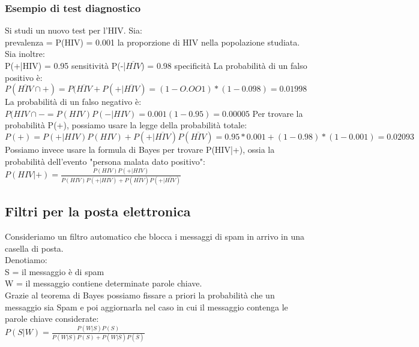 \documentclass{article}
\begin{document}
\subsubsection{Esempio di test diagnostico}
Si studi un nuovo test per l'HIV.
Sia:\\
prevalenza = P(HIV) = 0.001 la proporzione di HIV nella popolazione studiata.\\
Sia inoltre:\\
P(+|HIV) = 0.95 sensitività
P(-|$\overline{HIV}$) = 0.98 specificità
La probabilità di un falso positivo è:\\
$P(\overline{HIV}\cap{+}) = P(\overline{HIV}+P(+|\overline{HIV}) = (1-O.OO1)*(1-0.098) = 0.01998$\\
La probabilità di un falso negativo è:\\
$P({HIV}\cap{-} = P(HIV)P(-|HIV) = 0.001(1-0.95) = 0.00005$
Per trovare la probabilità P(+), possiamo usare la legge della probabilità totale:\\
$P(+) = P (+|HIV)P(HIV)+P(+|\overline{HIV})P(\overline{HIV}) = 0.95*0.001+(1-0.98)*(1-0.001) = 0.02093$\\
Possiamo invece usare la formula di Bayes per trovare P(HIV|+), ossia la probabilità dell'evento "persona malata dato positivo":\\
$P(HIV|+)=\frac{P(HIV)P(+|HIV)}{P(HIV)P(+|HIV)+P(\overline{HIV})P(+|\overline{HIV})}$
\subsection{Filtri per la posta elettronica}
Consideriamo un filtro automatico che blocca i messaggi di spam in arrivo in una casella di posta.\\
Denotiamo:\\
S = il messaggio è  di spam\\
W =  il messaggio contiene determinate parole chiave.\\
Grazie al teorema di Bayes possiamo fissare a priori la probabilità che un messaggio sia Spam e poi aggiornarla nel caso in cui il messaggio contenga le parole chiave considerate:\\
$P(S|W) = \frac{P(W|S)P(S)}{P(W|S)P(S)+P(W|\overline{S})P(\overline{S})}$
\end{document}
